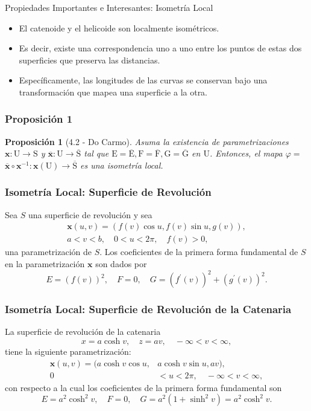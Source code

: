 \documentclass[10pt]{beamer}
\newtheorem{prop}{Proposición}
\begin{document}
\begin{frame}{Propiedades Importantes e Interesantes: Isometría Local}
  \begin{itemize}
      \item El catenoide y el helicoide son localmente isométricos.
      \item Es decir, existe una correspondencia uno a uno entre los puntos de estas dos superficies que preserva las distancias.
      \item Específicamente, las longitudes de las curvas se conservan bajo una transformación que mapea una superficie a la otra.
  \end{itemize}
  \end{frame}

\begin{frame}
  \frametitle{Proposición 1}
  \begin{cajita}
    \begin{prop}[4.2 - Do Carmo]
      Asuma la existencia de parametrizaciones $\mathbf{x}: \mathrm{U} \rightarrow \mathrm{S}$ y $\overline{\mathbf{x}}: \mathrm{U} \rightarrow \overline{\mathrm{S}}$ tal que $\mathrm{E}=\overline{\mathrm{E}}, \mathrm{F}=\overline{\mathrm{F}}, \mathrm{G}=\overline{\mathrm{G}}$ en $\mathrm{U}$. Entonces, el mapa $\varphi=$ $\overline{\mathbf{x}} \circ \mathbf{x}^{-1}: \mathbf{x}(\mathrm{U}) \rightarrow \overline{\mathrm{S}}$ es una isometría local.
    \end{prop}
  \end{cajita}


  \end{frame}
  
  \begin{frame}
  \frametitle{Isometría Local: Superficie de Revolución}
  Sea $S$ una superficie de revolución y sea
  \[
  \begin{aligned}
  \mathbf{x}(u, v)=(f(v) \cos u, f(v) \sin u, g(v)), \\
  a<v<b, \quad 0<u<2 \pi, \quad f(v)>0,
  \end{aligned}
  \]
  una parametrización de $S$. Los coeficientes de la primera forma fundamental de $S$ en la parametrización $\mathbf{x}$ son dados por
  \[
  E=(f(v))^2, \quad F=0, \quad G=\left(f^{\prime}(v)\right)^2+\left(g^{\prime}(v)\right)^2 .
  \]
  \end{frame}
  
  \begin{frame}
  \frametitle{Isometría Local: Superficie de Revolución de la Catenaria}
  La superficie de revolución de la catenaria
  \[
  x=a \cosh v, \quad z=a v, \quad-\infty<v<\infty,
  \]
  tiene la siguiente parametrización:
  \[
  \begin{aligned}
  \mathbf{x}(u, v)=(a \cosh v \cos u, & a \cosh v \sin u, a v), \\
  0 & <u<2 \pi, \quad-\infty<v<\infty,
  \end{aligned}
  \]
  con respecto a la cual los coeficientes de la primera forma fundamental son
  \[
  E=a^2 \cosh ^2 v, \quad F=0, \quad G=a^2\left(1+\sinh ^2 v\right)=a^2 \cosh ^2 v .
  \]
  \end{frame}
  
\end{document}
